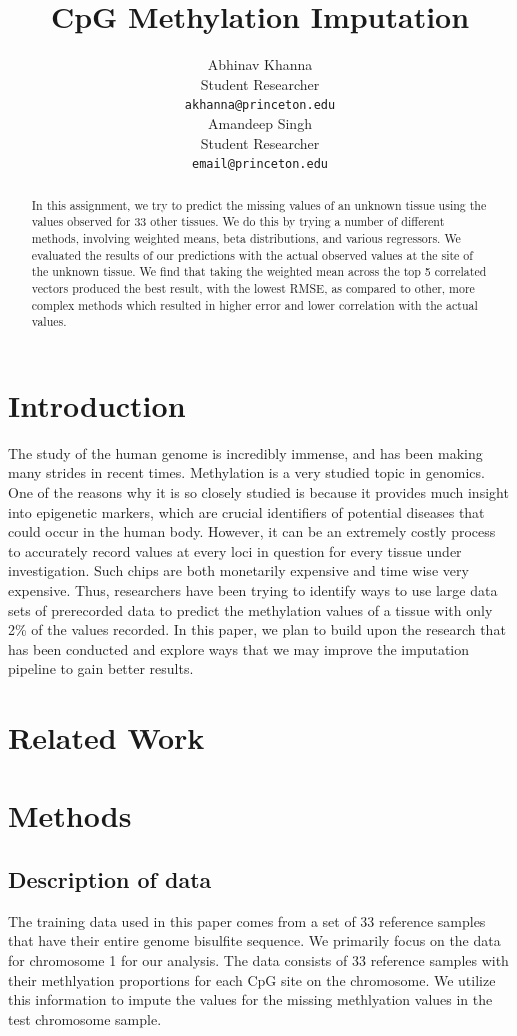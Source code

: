 \documentclass{article} %
\title{CpG Methylation Imputation}
\author{
Abhinav Khanna\\
Student Researcher\\
\texttt{akhanna@princeton.edu} \\
\And
Amandeep Singh \\
Student Researcher \\
\texttt{email@princeton.edu} \\
}
\begin{document}
\maketitle

\begin{abstract}
In this assignment, we try to predict the missing values of an unknown tissue using the values observed for 33 other tissues. We do this by trying a number of different methods, involving weighted means, beta distributions, and various regressors. We evaluated the results of our predictions with the actual observed values at the site of the unknown tissue.  We find that taking the weighted mean across the top 5 correlated vectors produced the best result, with the lowest RMSE, as compared to other, more complex methods which resulted in higher error and lower correlation with the actual values. 
\end{abstract}

\section{Introduction}
The study of the human genome is incredibly immense, and has been making many strides in recent times. Methylation is a very studied topic in genomics. One of the reasons why it is so closely studied is because it provides much insight into epigenetic markers, which are crucial identifiers of potential diseases that could occur in the human body. However, it can be an extremely costly process to accurately record values at every loci in question for every tissue under investigation. Such chips are both monetarily expensive and time wise very expensive. Thus, researchers have been trying to identify ways to use large data sets of prerecorded data to predict the methylation values of a tissue with only 2\% of the values recorded. In this paper, we plan to build upon the research that has been conducted and explore ways that we may improve the imputation pipeline to gain better results.

\section{Related Work}


\section{Methods}
\subsection{Description of data}
The training data used in this paper comes from a set of 33 reference samples that have their entire genome bisulfite sequence. We primarily focus on the data for chromosome 1 for our analysis. The data consists of 33 reference samples with their methlyation proportions for each CpG site on the chromosome. We utilize this information to impute the values for the missing methlyation values in the test chromosome sample.
\end{document}
